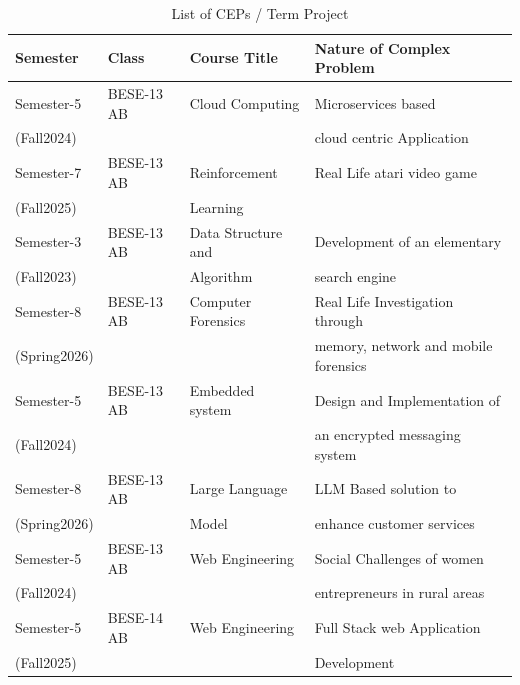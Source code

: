 \begin{table}[htbp]
\centering
\footnotesize %
\renewcommand{\arraystretch}{0.85} %
\caption{List of CEPs / Term Project}
\label{tab:List_of_CEPs}
\begin{tabular}{>{\raggedright\arraybackslash}p{}
                >{\centering\arraybackslash}p{}
                >{\raggedright\arraybackslash}p{}
                >{\raggedright\arraybackslash}p{}}
\toprule
\textbf{Semester} & \textbf{Class} & \textbf{Course Title} & \textbf{Nature of Complex Problem} \\
\midrule

Semester-5 & BESE-13 AB & Cloud Computing & Microservices based \\
(Fall2024)&&&cloud centric Application \\
\addlinespace

Semester-7 & BESE-13 AB & Reinforcement & Real Life atari video game \\ 
(Fall2025)&&Learning&\\
\addlinespace

Semester-3 & BESE-13 AB & Data Structure and & Development of an elementary \\
(Fall2023)&&Algorithm&search engine \\ 
\addlinespace

Semester-8 & BESE-13 AB & Computer Forensics & Real Life Investigation through \\
(Spring2026)&&&memory, network and mobile forensics \\ 
\addlinespace

Semester-5 & BESE-13 AB & Embedded system & Design and Implementation of \\
(Fall2024)&&&an encrypted messaging system \\ \addlinespace

Semester-8 & BESE-13 AB & Large Language & LLM Based solution to \\
(Spring2026)&&Model&enhance customer services \\ \addlinespace

Semester-5 & BESE-13 AB & Web Engineering & Social Challenges of women \\
(Fall2024)&&&entrepreneurs in rural areas \\ \addlinespace

Semester-5 & BESE-14 AB & Web Engineering & Full Stack web Application \\
(Fall2025)&&&Development \\

\bottomrule
\end{tabular}
\end{table}

